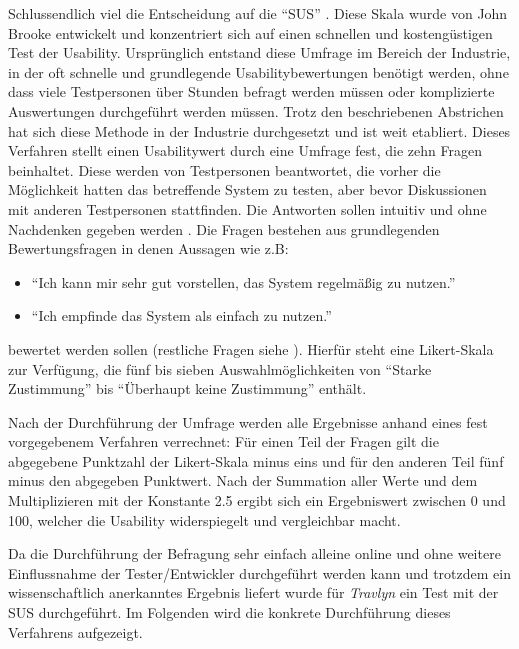 	Schlussendlich viel die Entscheidung auf die \enquote{\ac{SUS}} \cite{Brooke.1996}. Diese Skala wurde von John Brooke entwickelt und konzentriert sich auf einen schnellen und kostengüstigen Test der Usability. Ursprünglich entstand diese Umfrage im Bereich der Industrie, in der oft schnelle und grundlegende Usabilitybewertungen benötigt werden, ohne dass viele Testpersonen über Stunden befragt werden müssen oder komplizierte Auswertungen durchgeführt werden müssen. Trotz den beschriebenen Abstrichen hat sich diese Methode in der Industrie durchgesetzt und ist weit etabliert\cite{MatthiasRauer.11.April}. Dieses Verfahren stellt einen Usabilitywert durch eine Umfrage fest, die zehn Fragen beinhaltet. Diese werden von Testpersonen beantwortet, die vorher die Möglichkeit hatten das betreffende System zu testen, aber bevor Diskussionen mit anderen Testpersonen stattfinden. Die Antworten sollen intuitiv und ohne Nachdenken gegeben werden \cite{Brooke.1996}. Die Fragen bestehen aus grundlegenden Bewertungsfragen in denen Aussagen wie z.B:
	
	\begin{itemize}
		\item \enquote{Ich kann mir sehr gut vorstellen, das System regelmäßig zu nutzen.}
		\item \enquote{Ich empfinde das System als einfach zu nutzen.}
	\end{itemize}

bewertet werden sollen (restliche Fragen siehe \cite{Brooke.1996}). Hierfür steht eine Likert-Skala \cite{Joshi.2015} zur Verfügung, die fünf bis sieben Auswahlmöglichkeiten von \enquote{Starke Zustimmung} bis \enquote{Überhaupt keine Zustimmung} enthält.

\vspace{0.25cm}

Nach der Durchführung der Umfrage werden alle Ergebnisse anhand eines fest vorgegebenem Verfahren verrechnet: Für einen Teil der Fragen gilt die abgegebene Punktzahl der Likert-Skala minus eins und für den anderen Teil fünf minus den abgegeben Punktwert. Nach der Summation aller Werte und dem Multiplizieren mit der Konstante 2.5 ergibt sich ein Ergebniswert zwischen 0 und 100, welcher die Usability widerspiegelt und vergleichbar macht.

\vspace{0.25cm}

Da die Durchführung der Befragung sehr einfach alleine online und ohne weitere Einflussnahme der Tester/Entwickler durchgeführt werden kann und trotzdem ein wissenschaftlich anerkanntes Ergebnis liefert wurde für \textit{Travlyn} ein Test mit der \acs{SUS} durchgeführt. Im Folgenden wird die konkrete Durchführung dieses Verfahrens aufgezeigt.    
	
